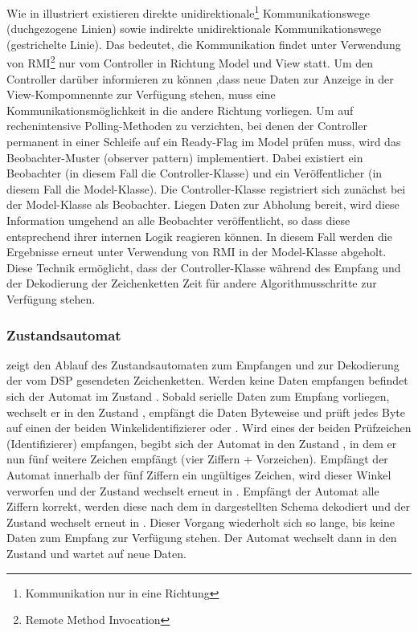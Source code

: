 Wie in  illustriert existieren direkte unidirektionale\footnote{Kommunikation nur in eine Richtung} Kommunikationswege (duchgezogene Linien) sowie indirekte unidirektionale Kommunikationswege (gestrichelte Linie). Das bedeutet, die Kommunikation findet unter Verwendung von RMI\footnote{Remote Method Invocation} nur vom Controller in Richtung Model und View statt. Um den Controller darüber informieren zu können ,dass neue Daten zur Anzeige in der View-Kompomnennte zur Verfügung stehen, muss eine Kommunikationsmöglichkeit in die andere Richtung vorliegen. Um auf rechenintensive Polling-Methoden zu verzichten, bei denen der Controller permanent in einer Schleife auf ein Ready-Flag im Model prüfen muss, wird das Beobachter-Muster (observer pattern) implementiert. Dabei existiert ein Beobachter (in diesem Fall die Controller-Klasse) und ein Veröffentlicher (in diesem Fall die Model-Klasse). Die Controller-Klasse registriert sich zunächst bei der Model-Klasse als Beobachter. Liegen Daten zur Abholung bereit, wird diese Information umgehend an alle Beobachter veröffentlicht, so dass diese entsprechend ihrer internen Logik reagieren können. In diesem Fall werden die Ergebnisse erneut unter Verwendung von RMI in der Model-Klasse abgeholt. Diese Technik ermöglicht, dass der Controller-Klasse während des Empfang und der Dekodierung der Zeichenketten Zeit für andere Algorithmusschritte zur Verfügung stehen.




\subsubsection{Zustandsautomat}
 zeigt den Ablauf des Zustandsautomaten zum Empfangen und zur Dekodierung der vom DSP gesendeten Zeichenketten. Werden keine Daten empfangen befindet sich der Automat im Zustand . Sobald serielle Daten zum Empfang vorliegen, wechselt er in den Zustand , empfängt die Daten Byteweise und prüft jedes Byte auf einen der beiden Winkelidentifizierer  oder . Wird eines der beiden Prüfzeichen (Identifizierer) empfangen, begibt sich der Automat in den Zustand , in dem er nun fünf weitere Zeichen empfängt (vier Ziffern + Vorzeichen). Empfängt der Automat innerhalb der fünf Ziffern ein ungültiges Zeichen, wird dieser Winkel verworfen und der Zustand wechselt erneut in . Empfängt der Automat alle Ziffern korrekt, werden diese nach dem in  dargestellten Schema dekodiert und der Zustand wechselt erneut in . Dieser Vorgang wiederholt sich so lange, bis keine Daten zum Empfang zur Verfügung stehen. Der Automat wechselt dann in den Zustand  und wartet auf neue Daten.




